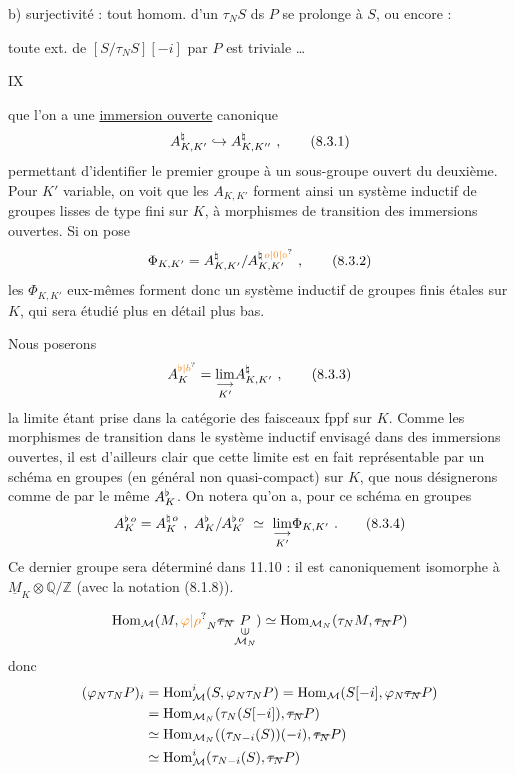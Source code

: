 b) surjectivité : tout homom.  d'un  $\tau_N S$ ds $P$ se prolonge à $S$, ou encore :

toute ext. de $[S/\tau_N S][-i]$ par $P$ est triviale \ldots

\hfill IX

que l'on a une \uline{immersion ouverte} canonique
\[
A^{\handwritten{\natural}}_{K,K'}\handwritten{\hookrightarrow}A^{\handwritten{\natural}}_{K,K''}\ ,\tag*{(8.3.1)}
\]
permettant d'identifier le premier groupe à un sous-groupe ouvert du deuxième. Pour $K'$ variable, on voit que les $A_{K,K'}$ forment ainsi un système inductif de groupes lisses de type fini sur $K$, à morphismes de transition des immersions ouvertes. Si on pose
\[
\Phi_{K,K'}=A^{\handwritten{\natural}}_{K,K'}/A^{\handwritten{\natural}\,\unsure{o|0|\circ}}_{K,K'}\ ,\tag*{(8.3.2)}
\]
les $\Phi_{K,K'}$ eux-mêmes forment donc un système inductif de groupes finis étales sur $K$, qui sera étudié plus en détail plus bas.

Nous poserons
\[
A^{\handwritten{\unsure{\flat|b}}}_K=\underset{K'}{\mathop{\lim}\limits_{\handwritten{\longrightarrow}}}A^{\handwritten{\natural}}_{K,K'}\ ,\tag*{(8.3.3)}
\]
la limite étant prise dans la catégorie des faisceaux fppf sur $K$. Comme les morphismes de transition dans le système inductif envisagé dans des immersions ouvertes, il est d'ailleurs clair que cette limite est en fait représentable par un schéma en groupes (en général non quasi-compact) sur $K$, que nous désignerons comme de  par le même  $A^{\flat}_K$. On notera qu'on a, pour ce schéma en groupes
\[
A_K^{\handwritten{\flat}\,o}=A_K^{\handwritten{\natural}\,o}\ ,\
A_K^{\handwritten{\flat}}/A_K^{\handwritten{\flat}\,o}\ \simeq\
\underset{K'}{\mathop{\lim}\limits_{\handwritten{\longrightarrow}}}\Phi_{K,K'}\ .\tag*{(8.3.4)}
\]
Ce dernier groupe sera déterminé dans 11.10 : il est canoniquement isomorphe à $\underline{M}_K\otimes\mathbb Q/\mathbb Z$ (avec la notation (8.1.8)).

\handwritten{417}

\[
\operatorname{Hom}_{\mathcal M}(M,\unsure{\varphi|\rho}_N\deleted{\tau_N}\underset{\substack{\rotatebox{90}{$\in$}\\\mathcal M_N}}{P})\simeq
\operatorname{Hom}_{\mathcal M_N}(\tau_N M,\deleted{\tau_N}P)
\]
donc
\[
\begin{aligned}
(\varphi_N\tau_N P)_i&=\operatorname{Hom}_{\mathcal M}^i(S,\varphi_N\tau_N P)=\operatorname{Hom}_{\mathcal M}(S[-i],\varphi_N\deleted{\tau_N}P)\\
&=\operatorname{Hom}_{\mathcal M_N}(\tau_N(S[-i]),\deleted{\tau_N}P)\\
&\simeq\operatorname{Hom}_{\mathcal M_N}((\tau_{N-i}(S))(-i),\deleted{\tau_N}P)\\
&\simeq\operatorname{Hom}_{\mathcal M}^i(\tau_{N-i}(S),\deleted{\tau_N}P)
\end{aligned}
\]

